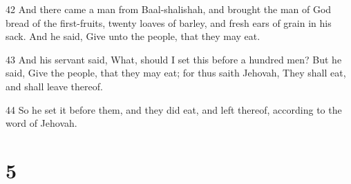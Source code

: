 \par 42 And there came a man from Baal-shalishah, and brought the man of God bread of the first-fruits, twenty loaves of barley, and fresh ears of grain in his sack. And he said, Give unto the people, that they may eat.
\par 43 And his servant said, What, should I set this before a hundred men? But he said, Give the people, that they may eat; for thus saith Jehovah, They shall eat, and shall leave thereof.
\par 44 So he set it before them, and they did eat, and left thereof, according to the word of Jehovah.

\chapter{5}

